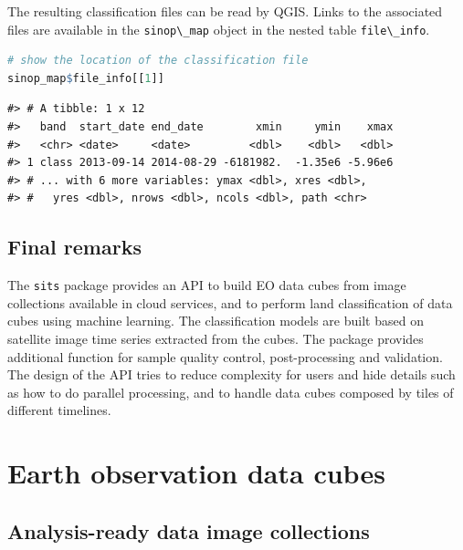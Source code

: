 \documentclass[
  11pt,
]{report}
\newcommand{\passthrough}[1]{#1}
\begin{document}
The resulting classification files can be read by QGIS. Links to the
associated files are available in the
\passthrough{\lstinline!sinop\_map!} object in the nested table
\passthrough{\lstinline!file\_info!}.

\begin{lstlisting}[language=R]
# show the location of the classification file
sinop_map$file_info[[1]]
\end{lstlisting}

\begin{lstlisting}
#> # A tibble: 1 x 12
#>   band  start_date end_date        xmin     ymin    xmax
#>   <chr> <date>     <date>         <dbl>    <dbl>   <dbl>
#> 1 class 2013-09-14 2014-08-29 -6181982.  -1.35e6 -5.96e6
#> # ... with 6 more variables: ymax <dbl>, xres <dbl>,
#> #   yres <dbl>, nrows <dbl>, ncols <dbl>, path <chr>
\end{lstlisting}

\hypertarget{final-remarks}{%
\section*{Final remarks}\label{final-remarks}}

The \passthrough{\lstinline!sits!} package provides an API to build EO
data cubes from image collections available in cloud services, and to
perform land classification of data cubes using machine learning. The
classification models are built based on satellite image time series
extracted from the cubes. The package provides additional function for
sample quality control, post-processing and validation. The design of
the API tries to reduce complexity for users and hide details such as
how to do parallel processing, and to handle data cubes composed by
tiles of different timelines.

\hypertarget{earth-observation-data-cubes}{%
\chapter*{Earth observation data
cubes}\label{earth-observation-data-cubes}}

\hypertarget{analysis-ready-data-image-collections}{%
\section*{Analysis-ready data image
collections}\label{analysis-ready-data-image-collections}}
\end{document}
